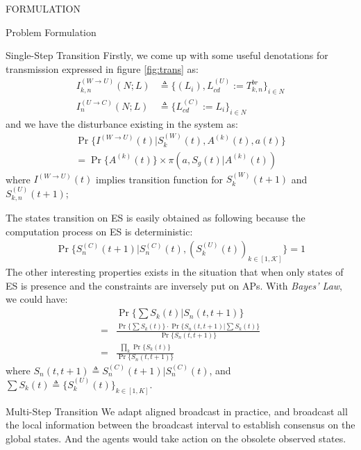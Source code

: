 \documentclass[10pt, conference, letterpaper]{IEEEtran}
\begin{document}
\begin{section}{FORMULATION}
\begin{subsection}{Problem Formulation}
\begin{subsubsection}{Single-Step Transition}
                Firstly, we come up with some useful denotations for transmission expressed in figure \ref{fig:trans} as:
                \begin{align*}
                    I^{(W \to U)}_{k,n}(N;L) &\triangleq \{ (L_i),L^{(U)}_{cd}:=T^{br}_{k,n} \}_{i \in N}
                        \\
                    I^{(U \to C)}_{n}(N;L) &\triangleq \{ L^{(C)}_{cd}:=L_i \}_{i \in N}
                \end{align*}
                and we have the disturbance existing in the system as:
                \begin{gather*}
                    \Pr\{ I^{(W \to U)}(t) | S_{k}^{(W)}(t),A^{(k)}(t), a(t) \}
                    \\
                        = \Pr\{ A^{(k)}(t) \} \times \pi(a, S_g(t)|A^{(k)}(t))
                \end{gather*}
                where $I^{(W \to U)}(t)$ implies transition function for $S^{(W)}_{k}(t+1)$ and $S^{(U)}_{k,n}(t+1)$;

                The states transition on ES is easily obtained as following because the computation process on ES is deterministic:
                \begin{gather}
                    \Pr\{ S_{n}^{(C)}(t+1) |S_{n}^{(C)}(t), (S_{k}^{(U)}(t))_{k \in [1,\mathcal{K}]} \} = 1
                \end{gather}
                The other interesting properties exists in the situation that when only states of ES is presence and the constraints are inversely put on APs. With \emph{Bayes' Law}, we could have:
                \begin{align}
                    & \Pr\{ \sum{S_k(t)} | S_n(t,t+1) \} \nonumber\\
                    =& \frac{ \Pr\{\sum{S_k(t)}\} \cdot \Pr\{S_n(t,t+1)|\sum{S_k(t)}\} }{ \Pr\{S_n(t,t+1)\} } \nonumber\\
                    =& \frac{
                            \prod_k \Pr\{S_k(t)\}
                        }{
                            \Pr\{S_n(t,t+1)\}
                        }
                \end{align}
                where $S_n(t,t+1) \triangleq S_{n}^{(C)}(t+1) |S_{n}^{(C)}(t)$, and $\sum{S_k(t)} \triangleq \{S_{k}^{(U)}(t)\}_{k \in [1,K]}$.
            \end{subsubsection}

            \begin{subsubsection}{Multi-Step Transition}
                We adapt aligned broadcast in practice, and broadcast all the local information between the broadcast interval to establish consensus on the global states. And the agents would take action on the obsolete observed states.


\end{subsubsection}
\end{subsection}
\end{section}
\end{document}

